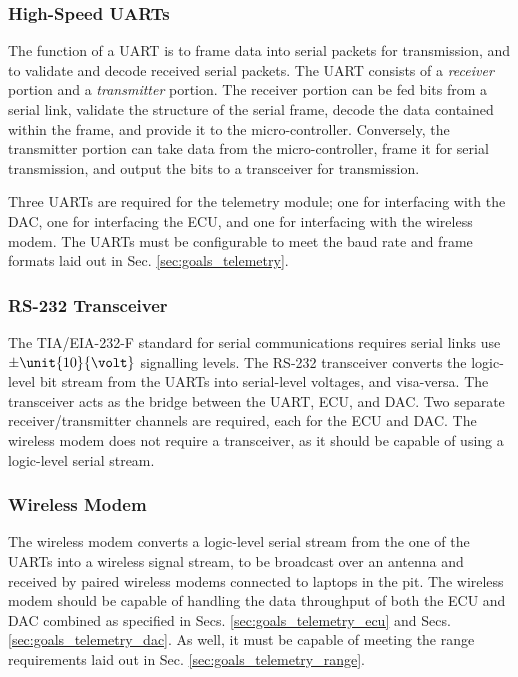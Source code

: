 \subsubsection{High-Speed UARTs}

The function of a UART is to frame data into serial packets for transmission, and to validate and decode received serial packets. The UART consists of a \emph{receiver} portion and a \emph{transmitter} portion. The receiver portion can be fed bits from a serial link, validate the structure of the serial frame, decode the data contained within the frame, and provide it to the micro-controller. Conversely, the transmitter portion can take data from the micro-controller, frame it for serial transmission, and output the bits to a transceiver for transmission.

Three UARTs are required for the telemetry module; one for interfacing with the DAC, one for interfacing the ECU, and one for interfacing with the wireless modem. The UARTs must be configurable to meet the baud rate and frame formats laid out in Sec. \ref{sec:goals_telemetry}.

\subsubsection{RS-232 Transceiver}

The TIA/EIA-232-F standard for serial communications requires serial links use $\pm \unit{10}{\volt}$ signalling levels. The RS-232 transceiver converts the logic-level bit stream from the UARTs into serial-level voltages, and visa-versa. The transceiver acts as the bridge between the UART, ECU, and DAC. Two separate receiver/transmitter channels are required, each for the ECU and DAC. The wireless modem does not require a transceiver, as it should be capable of using a logic-level serial stream.

\subsubsection{Wireless Modem}

The wireless modem converts a logic-level serial stream from the one of the UARTs into a wireless signal stream, to be broadcast over an antenna and received by paired wireless modems connected to laptops in the pit. The wireless modem should be capable of handling the data throughput of both the ECU and DAC combined as specified in Secs. \ref{sec:goals_telemetry_ecu} and Secs. \ref{sec:goals_telemetry_dac}. As well, it must be capable of meeting the range requirements laid out in Sec. \ref{sec:goals_telemetry_range}.

